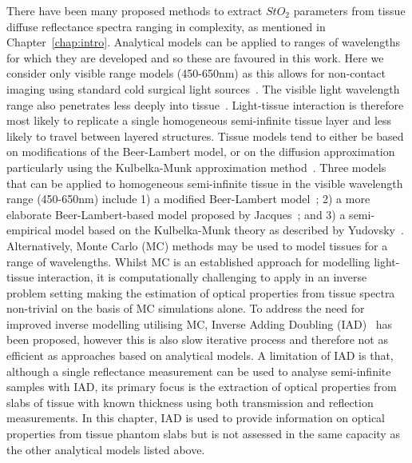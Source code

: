 There have been many proposed methods to extract $StO_2$ parameters from tissue diffuse reflectance spectra ranging in complexity, as mentioned in Chapter~\ref{chap:intro}.
Analytical models can be applied to ranges of wavelengths for which they are developed and so these are favoured in this work. 
Here we consider only visible range models (450-650nm) as this allows for non-contact imaging using standard cold surgical light sources~\citep{Clancy2011}.
The visible light wavelength range also penetrates less deeply into tissue~\citep{Eggert1987, Sabino2016}. Light-tissue interaction is therefore most likely to replicate a single homogeneous semi-infinite tissue layer and less likely to travel between layered structures.
Tissue models tend to either be based on modifications of the Beer-Lambert model, or on the diffusion approximation particularly using the Kulbelka-Munk approximation method~\citep{MacKenzie2018}. Three models that can be applied to homogeneous semi-infinite tissue in the visible wavelength range (450-650nm) include 1) a modified Beer-Lambert model~\citep{Clancy2015}; 2) a more elaborate Beer-Lambert-based model proposed by Jacques~\citep{Jacques1999}; and 3) a semi-empirical model based on the Kulbelka-Munk theory as described by Yudovsky~\citep{Yudovsky2009}.
Alternatively, Monte Carlo (MC) methods may be used to model tissues for a range of wavelengths. Whilst MC is an established approach for modelling light-tissue interaction, it is computationally challenging to apply in an inverse problem setting making the estimation of optical properties from tissue spectra non-trivial on the basis of MC simulations alone.
To address the need for improved inverse modelling utilising MC, Inverse Adding Doubling (IAD)~\citep{Prahl2017, Milanic2024} has been proposed, however this is also slow iterative process and therefore not as efficient as approaches based on analytical models.
A limitation of IAD is that, although a single reflectance measurement can be used to analyse semi-infinite samples with IAD, its primary focus is the extraction of optical properties from slabs of tissue with known thickness using both transmission and reflection measurements.
In this chapter, IAD is used to provide information on optical properties from tissue phantom slabs but is not assessed in the same capacity as the other 
analytical models listed above. 

